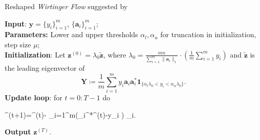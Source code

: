 



















	\begin{algorithm}
	\caption{Reshaped \emph{Wirtinger Flow} suggested by \cite{bib:rfw-irwf}}\label{alg:rwf}
		\textbf{Input}: $\boldsymbol{y}=\{y_i\}_{i=1}^m$, $\{\boldsymbol{a}_i\}_{i=1}^m$; \\
		\textbf{Parameters:}  Lower and upper thresholds $\alpha_l,\alpha_u$ for  truncation in initialization, step size $\mu$;\\
		\textbf{Initialization}: Let $\boldsymbol{z}^{(0)}=\lambda_0 \tilde{\boldsymbol{z}}$, where $\lambda_0=\frac{mn}{\sum_{i=1}^m \|\boldsymbol{a}_i\|_1}\cdot \left(\frac{1}{m}\sum_{i=1}^m y_i\right)$ and $\tilde{\boldsymbol{z}}$ is the leading eigenvector of
		\begin{equation}\label{eq:init_TRWF}
			\boldsymbol{Y} \coloneqq \frac{1}{m}\sum_{i=1}^m y_i\boldsymbol{a}_i \boldsymbol{a}_i^*\boldsymbol{1}_{\{\alpha_l \lambda_0<y_i< \alpha_u \lambda_0\}}.
		\end{equation}
		\textbf{Update loop}: for $t=0:T-1$ do
		\begin{flalign}\label{eq:loop_FWF}
			^{(t+1)}=^{(t)}- \sum_{i=1}^{m}\left(_i^*^{(t)}-y_i\cdot{} \right) _i.
		\end{flalign}
		\textbf{Output} $\boldsymbol{z}^{(T)}$.
	\end{algorithm}

